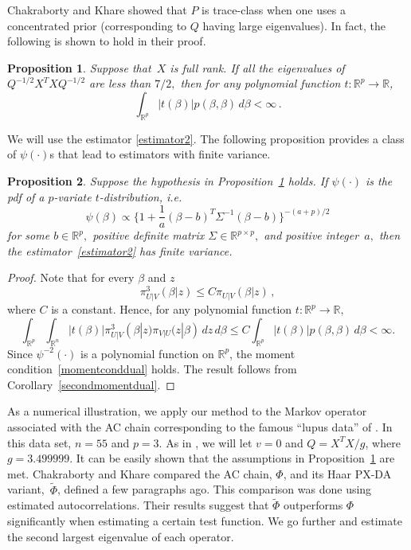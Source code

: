 \documentclass[11pt]{article}
\newtheorem{proposition}{Proposition}
\begin{document}
        Chakraborty and Khare
        showed that $P$ is trace-class when one uses a concentrated
        prior (corresponding to $Q$ having large eigenvalues). In
        fact, the following is shown to hold in their proof.
	\begin{proposition} \label{probittrace} Suppose that~$X$ is full
          rank. If all the eigenvalues of $Q^{-1/2}X^TXQ^{-1/2}$ are less
          than $7/2,$ then for any polynomial function $t:
          \mathbb{R}^p \to \mathbb{R}$,
		\[
		\int_{\mathbb{R}^p} |t(\beta)| p(\beta,\beta) \,
                d\beta < \infty \,.
		\]
	\end{proposition}
	We will use the estimator \eqref{estimator2}.  The following
        proposition provides a class of $\psi(\cdot)$s that lead to
        estimators with finite variance.
	\begin{proposition} \label{probitpsi} Suppose the hypothesis
          in Proposition~\ref{probittrace} holds. If $\psi(\cdot)$ is
          the pdf of a $p$-variate $t$-distribution, i.e.
		\[
		\psi(\beta) \propto \bigg\{ 1 + \frac{1}{a}(\beta - b)^T \Sigma^{-1}  (\beta - b) \bigg\}^{-(a+p)/2}
		\]
		for some $b \in \mathbb{R}^p,$ positive definite
                matrix $\Sigma \in \mathbb{R}^{p \times p},$ and
                positive integer~$a,$ then the
                estimator~\eqref{estimator2} has finite variance.
	\end{proposition}
	\begin{proof}
          Note that for every $\beta$ and $z$
		\[
		\pi^3_{U|V} (\beta|z) \leq C \pi_{U|V} (\beta|z) \,,
		\]
		where $C$ is a constant. Hence, for any polynomial
                function $t: \mathbb{R}^p \to \mathbb{R},$
		\[
		\int_{\mathbb{R}^p} \int_{\mathbb{R}^n} |t(\beta)|
                \pi^3_{U|V} (\beta|z) \pi_{V|U} (z|\beta) \,
                dz\,d\beta \leq C\int_{\mathbb{R}^p} |t(\beta)|
                p(\beta,\beta) \, d\beta < \infty.
		\]
		Since $\psi^{-2}(\cdot)$ is a polynomial function on
                $\mathbb{R}^p$, the moment
                condition~\eqref{momentconddual} holds. The result
                follows from Corollary~\ref{secondmomentdual}.
	\end{proof}
	
        As a numerical illustration, we apply our method to the Markov
        operator associated with the AC chain corresponding to the
        famous ``lupus data'' of \cite{van2001art}.  In this data set,
        $n=55$ and $p=3$.  As in \cite{chakraborty2016convergence}, we
        will let $v=0$ and $Q=X^TX/g$, where $g=3.499999$.  It can be easily
        shown that the assumptions in Proposition~\ref{probittrace}
        are met.  Chakraborty and Khare compared the AC
        chain, $\Phi$, and its Haar PX-DA variant,~$\tilde{\Phi}$, defined a few paragraphs ago. This comparison
        was done using estimated autocorrelations.  Their results
        suggest that $\tilde{\Phi}$ outperforms $\Phi$ significantly
        when estimating a certain test function.  We go further and
        estimate the second largest eigenvalue of each operator.
\end{document}
